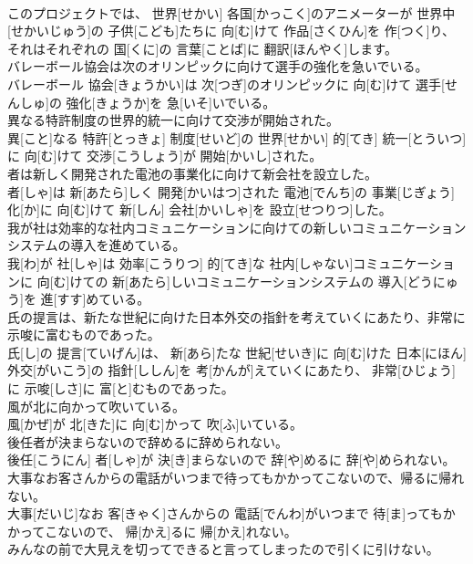 \documentclass[8pt]{extreport}
\begin{document}
\begin{CJK}{UTF8}{min}
\\	このプロジェクトでは、 世界[せかい] 各国[かっこく]のアニメーターが 世界中[せかいじゅう]の 子供[こども]たちに 向[む]けて 作品[さくひん]を 作[つく]り、それはそれぞれの 国[くに]の 言葉[ことば]に 翻訳[ほんやく]します。
\\	バレーボール協会は次のオリンピックに向けて選手の強化を急いでいる。	
\\	バレーボール 協会[きょうかい]は 次[つぎ]のオリンピックに 向[む]けて 選手[せんしゅ]の 強化[きょうか]を 急[いそ]いでいる。
\\	異なる特許制度の世界的統一に向けて交渉が開始された。	
\\	異[こと]なる 特許[とっきょ] 制度[せいど]の 世界[せかい] 的[てき] 統一[とういつ]に 向[む]けて 交渉[こうしょう]が 開始[かいし]された。
\\	者は新しく開発された電池の事業化に向けて新会社を設立した。	
\\	者[しゃ]は 新[あたら]しく 開発[かいはつ]された 電池[でんち]の 事業[じぎょう] 化[か]に 向[む]けて 新[しん] 会社[かいしゃ]を 設立[せつりつ]した。
\\	我が社は効率的な社内コミュニケーションに向けての新しいコミュニケーションシステムの導入を進めている。	
\\	我[わ]が 社[しゃ]は 効率[こうりつ] 的[てき]な 社内[しゃない]コミュニケーションに 向[む]けての 新[あたら]しいコミュニケーションシステムの 導入[どうにゅう]を 進[すす]めている。
\\	氏の提言は、新たな世紀に向けた日本外交の指針を考えていくにあたり、非常に示唆に富むものであった。	
\\	氏[し]の 提言[ていげん]は、 新[あら]たな 世紀[せいき]に 向[む]けた 日本[にほん] 外交[がいこう]の 指針[ししん]を 考[かんが]えていくにあたり、 非常[ひじょう]に 示唆[しさ]に 富[と]むものであった。
\\	風が北に向かって吹いている。	
\\	風[かぜ]が 北[きた]に 向[む]かって 吹[ふ]いている。
\\	後任者が決まらないので辞めるに辞められない。	
\\	後任[こうにん] 者[しゃ]が 決[き]まらないので 辞[や]めるに 辞[や]められない。
\\	大事なお客さんからの電話がいつまで待ってもかかってこないので、帰るに帰れない。	
\\	大事[だいじ]なお 客[きゃく]さんからの 電話[でんわ]がいつまで 待[ま]ってもかかってこないので、 帰[かえ]るに 帰[かえ]れない。
\\	みんなの前で大見えを切ってできると言ってしまったので引くに引けない。	

\end{CJK}
\end{document}
